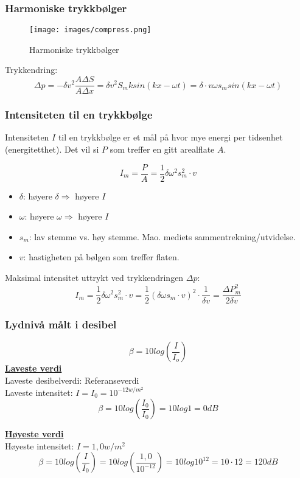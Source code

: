 \documentclass[12pt]{article}
\begin{document}
\subsubsection{Harmoniske trykkbølger}
\begin{figure} [H]
    \centering
    \texttt{[image: images/compress.png]}
    \caption{Harmoniske trykkbølger}
\end{figure}
Trykkendring:
$$\Delta p = -\delta v^2\frac{A\Delta S}{A\Delta x} = \delta v^2 S_m k sin (kx-\omega t) = \delta\cdot v\omega s_m sin(kx-\omega t)$$


\subsubsection{Intensiteten til en trykkbølge}
Intensiteten $I$ til en trykkbølge er et mål på hvor mye energi per tidsenhet (energitetthet). Det vil si $P$ som treffer en gitt arealflate $A$.

$$I_m = \frac{P}{A} = \frac{1}{2}\delta\omega^2s_m^2\cdot v$$
\begin{itemize}
    \item [] $\delta$: høyere $\delta \Rightarrow$ høyere $I$ 
    \item [] $\omega$: høyere $\omega \Rightarrow$ høyere $I$ 
    \item [] $s_m$: lav stemme vs. høy stemme. Mao. mediets sammentrekning/utvidelse. 
    \item [] $v$: hastigheten på bølgen som treffer flaten.
\end{itemize}
Maksimal intensitet uttrykt ved trykkendringen $\Delta p$:
$$I_m = \frac{1}{2}\delta\omega^2s_m^2\cdot v = \frac{1}{2}(\delta\omega s_m\cdot v)^2\cdot\frac{1}{\delta v} = \frac{\Delta P_m^2}{2\delta v}$$

\subsubsection{Lydnivå målt i desibel}
$$\beta = 10 log(\frac{I}{I_o})$$
\underline{\textbf{Laveste verdi}}\\
\bigskip
Laveste desibelverdi: Referanseverdi\\
Laveste intensitet: $I = I_0 = 10^{-12 w/m^2}$
$$\beta = 10 log(\frac{I_0}{I_0}) = 10 log 1 = 0dB$$

\underline{\textbf{Høyeste verdi}}\\
\bigskip
Høyeste intensitet: $I = 1,0 w/m^2$
$$\beta = 10 log(\frac{I}{I_0}) = 10 log(\frac{1,0}{10^{-12}}) = 10 log 10^{12} = 10\cdot 12 = 120dB$$
\end{document}
